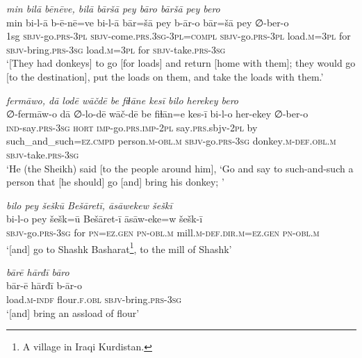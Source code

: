 \ea \label{HB.10}
\textit{min bilā bēnēve, bilā bāršā pey bāro bāršā pey bero} \\ 
\gll min bi-l-ā b-ē-nē=ve bi-l-ā bār=šā pey b-ār-o bār=šā pey ∅-ber-o \\ 
 1sg \textsc{sbjv-}go\textsc{.prs}\textsc{-3pl} \textsc{sbjv-}come\textsc{.prs}\textsc{.3sg}\textsc{-3pl}\textsc{=compl} \textsc{sbjv-}go\textsc{.prs}\textsc{-3pl} load\textsc{.m}\textsc{=3pl} for \textsc{sbjv-}bring\textsc{.prs}\textsc{-3sg} load\textsc{.m}\textsc{=3pl} for \textsc{sbjv-}take\textsc{.prs}\textsc{-3sg} \\ 
\glt `[They had donkeys] to go [for loads] and return [home with them]; they would go [to the destination], put the loads on them, and take the loads with them.'
\z 
 
\ea \label{HB.11}
\textit{fermāwo, dā lodē wāčdē be fiɫāne kesī bilo herekey bero} \\ 
\gll ∅-fermāw-o dā ∅-lo-dē wāč-dē be fiɫān=e kes-ī bi-l-o her-ekey ∅-ber-o \\ 
 \textsc{ind-}say\textsc{.prs}\textsc{-3sg} \textsc{hort} \textsc{imp-}go\textsc{.prs}\textsc{.imp}\textsc{-2pl} say\textsc{.prs}.sbjv\textsc{-2pl} by such\_and\_such\textsc{=ez}\textsc{.cmpd} person\textsc{.m}\textsc{-obl}\textsc{.m} \textsc{sbjv-}go\textsc{.prs}\textsc{-3sg} donkey\textsc{.m}\textsc{-def}\textsc{.obl}\textsc{.m} \textsc{sbjv-}take\textsc{.prs}\textsc{-3sg} \\ 
\glt `He (the Sheikh) said [to the people around him], ‘Go and say to such-and-such a person that [he should] go [and] bring his donkey; '
\z 
 
\ea \label{HB.12}
\textit{bilo pey šeškū Bešāretī, āsāwekew šeškī} \\ 
\gll bi-l-o pey šešk=ū Bešāret-ī āsāw-eke=w šešk-ī \\ 
 \textsc{sbjv-}go\textsc{.prs}\textsc{-3sg} for \textsc{pn}\textsc{=ez}\textsc{.gen} \textsc{pn}\textsc{-obl}\textsc{.m} mill\textsc{.m}\textsc{-def}\textsc{.dir}\textsc{.m}\textsc{=ez}\textsc{.gen} \textsc{pn}\textsc{-obl}\textsc{.m} \\ 
\glt `[and] go to Shashk Basharat\footnote{A village in Iraqi Kurdistan.}, to the mill of Shashk'
\z 
 
\ea \label{HB.13}
\textit{bārē hārđī bāro} \\ 
\gll bār-ē hārđī b-ār-o \\ 
 load\textsc{.m}\textsc{-indf} flour\textsc{\textsc{.f}}\textsc{.obl} \textsc{sbjv-}bring\textsc{.prs}\textsc{-3sg} \\ 
\glt `[and] bring an assload of flour'
\z 
 
